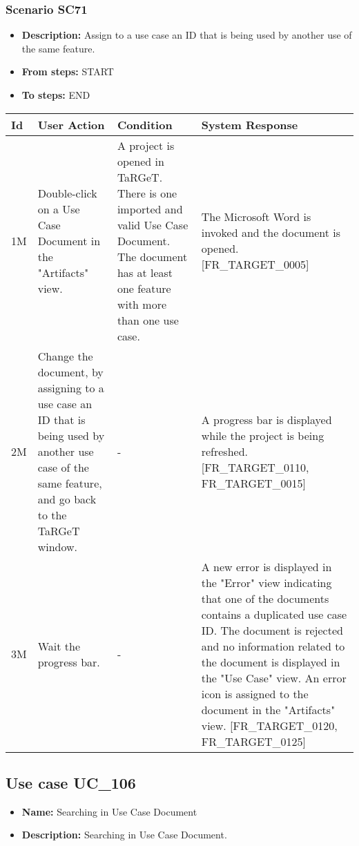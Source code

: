 \documentclass[a4paper,11pt]{article}
\newcommand{\bl}{\\ \hline}
\begin{document}
\subsubsection*{Scenario SC71}
\begin{itemize}
\item {\bf Description:} Assign to a use case an ID that is being used by
					another use of the same feature.
\item {\bf From steps:} START
\item {\bf To steps:} END
\end{itemize}
\begin{tabular}{|p{0.4in}|p{1.5in}|p{1.5in}|p{1.5in}|}
\hline
Id & User Action & Condition & System Response \bl 
1M & Double-click on a Use Case Document in the "Artifacts"
						view. & A project is opened in TaRGeT. There is one imported and
						valid Use Case Document. The document has at least one feature
						with more than one use case. & The Microsoft Word is invoked and the document is opened.
						[FR_TARGET_0005]\bl
2M & Change the document, by assigning to a use case an ID that
						is being used by another use case of the same feature, and go back
						to the TaRGeT window.  & - & A progress bar is displayed while the project is being
						refreshed. [FR_TARGET_0110, FR_TARGET_0015]\bl
3M & Wait the progress bar. & - & A new error is displayed in the "Error" view indicating
						that one of the documents contains a duplicated use case ID. The
						document is rejected and no information related to the document is
						displayed in the "Use Case" view. An error icon is assigned to the
						document in the "Artifacts" view. [FR_TARGET_0120, FR_TARGET_0125]
					\bl
\end{tabular}
\subsection*{Use case UC_106}
\begin{itemize}
\item {\bf Name: }Searching in Use Case Document
\item {\bf Description: }Searching in Use Case Document.
\end{itemize}
\end{document}
